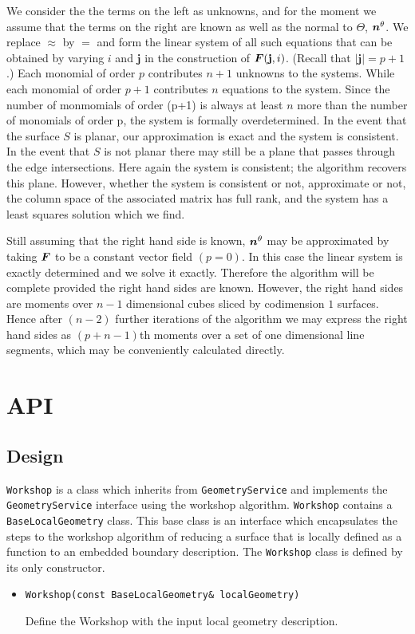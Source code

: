 We consider the the terms on the left as unknowns, and for the moment we assume that the terms on the right are known as well as the normal to $\Theta$, $\mbox{\boldmath $n$}^{\theta}$. We replace $\approx$ by $=$ and form the linear system of all such equations that can be obtained by varying $i$ and $\mathbf{j}$ in the construction of $\mbox{\boldmath $F$}(\mathbf {j},i)$. (Recall that $|\mathbf {j}| = p+1$.) Each monomial of order $p$ contributes $n+1$ unknowns to the systems. While each monomial of order $p+1$ contributes $n$ equations to the system. Since the number of monmomials of order (p+1) is always at least $n$ more than the number of monomials of order p, the system is formally overdetermined. In the event that the surface $S$ is planar, our approximation is exact and the system is consistent. In the event that $S$ is not planar there may still be a plane that passes through the edge intersections. Here again the system is consistent; the algorithm recovers this plane. However, whether the system is consistent or not, approximate or not, the column space of the associated matrix has full rank, and the system has a least squares solution which we find.

Still assuming that the right hand side is known, $\mbox{\boldmath $n$}^{\theta}$ may be approximated by taking $\mbox{\boldmath $F$}$ to be a constant vector field $(p=0)$. In this case the linear system is exactly determined and we solve it exactly. Therefore the algorithm will be complete provided the right hand sides are known. However, the right hand sides are moments over $n-1$ dimensional cubes sliced by codimension $1$ surfaces. Hence after $(n-2)$ further iterations of the algorithm we may express the right hand sides as  $(p+n-1)$th moments over a set of one dimensional line segments, which may be conveniently calculated directly.

\section{API}

\subsection{Design}

{\tt Workshop} is a class
which inherits from {\tt GeometryService} and 
implements the {\tt GeometryService} interface
using the workshop algorithm.  {\tt Workshop} contains
a {\tt BaseLocalGeometry} class.  This base class 
is an interface which encapsulates the steps
to the workshop algorithm of reducing a surface that is
locally defined as a function to an embedded boundary description.
The {\tt Workshop} class is defined by its only constructor.
\begin{itemize}
\item
\begin{small}\begin{verbatim}
Workshop(const BaseLocalGeometry& localGeometry)
\end{verbatim}\end{small}
Define the Workshop with the input local geometry description.
\end{itemize}

